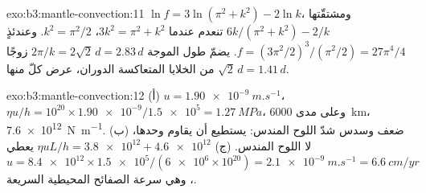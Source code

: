 \begin{solution}{exo:b3:mantle-convection:11}
$\ln f = 3\ln(\pi^2 + k^2) - 2\ln k$، ومشتقّتها $6k/(\pi^2 + k^2) - 2/k$
تنعدم عندما $3k^2 = \pi^2 + k^2$، $k^2 = \pi^2/2$. وعندئذٍ $f = (3\pi^2/2)^3/
(\pi^2/2) = 27\pi^4/4$. يضمّ طول الموجة $2\pi/k = 2\sqrt2\,d = 2.83\,d$ زوجًا
من الخلايا المتعاكسة الدوران، عرض كلّ منها $\sqrt2\,d = 1.41\,d$.
\end{solution}

\begin{solution}{exo:b3:mantle-convection:12}
(أ) $u = \qty{1.90e-9}{m.s^{-1}}$، $\eta u/h = 10^{20}\times\num{1.90e-9}/
\num{1.5e5} = \qty{1.27}{MPa}$، وعلى مدى \qty{6000}{km}، \qty{7.6e12}{N.m^{-1}}.
(ب) ضعف  وسدس شدّ اللوح المندس: يستطيع  أن يقاوم
 وحدها، لا اللوح المندس. (ج) $\eta uL/h = \num{3.8e12} +
\num{4.6e12}$ يعطي $u = \num{8.4e12}\times\num{1.5e5}/(\num{6e6}\times10^{20})
= \qty{2.1e-9}{m.s^{-1}} = \qty{6.6}{cm/yr}$، وهي سرعة الصفائح المحيطية
السريعة.
\end{solution}

